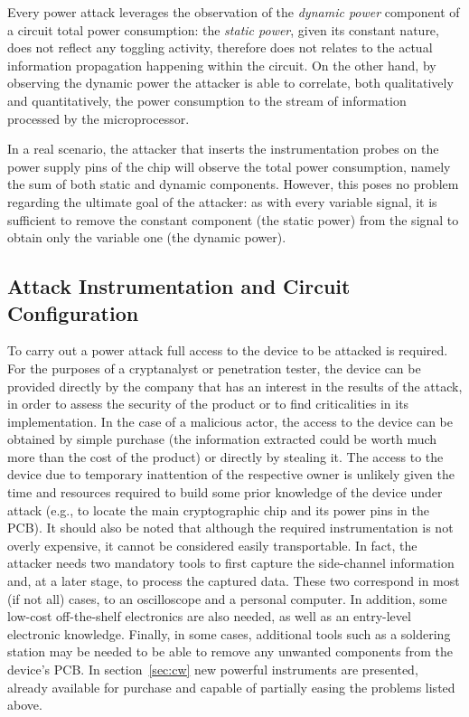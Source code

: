         Every power attack leverages the observation of the \emph{dynamic power} component of a circuit total power consumption: the \emph{static power}, given its constant nature, does not reflect any toggling activity, therefore does not relates to the actual information propagation happening within the circuit. On the other hand, by observing the dynamic power the attacker is able to correlate, both qualitatively and quantitatively, the power consumption to the stream of information processed by the microprocessor. 
        
        In a real scenario, the attacker that inserts the instrumentation probes on the power supply pins of the chip will observe the total power consumption, namely the sum of both static and dynamic components. However, this poses no problem regarding the ultimate goal of the attacker: as with every variable signal, it is sufficient to remove the constant component (the static power) from the signal to obtain only the variable one (the dynamic power).

        \subsection{Attack Instrumentation and Circuit Configuration}
            To carry out a power attack full access to the device to be attacked is required. For the purposes of a cryptanalyst or penetration tester, the device can be provided directly by the company that has an interest in the results of the attack, in order to assess the security of the product or to find criticalities in its implementation. In the case of a malicious actor, the access to the device can be obtained by simple purchase (the information extracted could be worth much more than the cost of the product) or directly by stealing it. The access to the device due to temporary inattention of the respective owner is unlikely given the time and resources required to build some prior knowledge of the device under attack (e.g., to locate the main cryptographic chip and its power pins in the PCB). It should also be noted that although the required instrumentation is not overly expensive, it cannot be considered easily transportable. In fact, the attacker needs two mandatory tools to first capture the side-channel information and, at a later stage, to process the captured data. These two correspond in most (if not all) cases, to an oscilloscope and a personal computer. In addition, some low-cost off-the-shelf electronics are also needed, as well as an entry-level electronic knowledge. Finally, in some cases, additional tools such as a soldering station may be needed to be able to remove any unwanted components from the device's PCB. In section~\ref{sec:cw} new powerful instruments are presented, already available for purchase and capable of partially easing the problems listed above.

